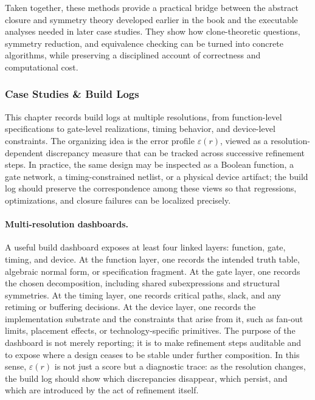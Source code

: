 \documentclass[11pt]{article}
\begin{document}
Taken together, these methods provide a practical bridge between the abstract closure and symmetry theory developed earlier in the book and the executable analyses needed in later case studies. They show how clone-theoretic questions, symmetry reduction, and equivalence checking can be turned into concrete algorithms, while preserving a disciplined account of correctness and computational cost.


\subsubsection{Case Studies \& Build Logs}

This chapter records build logs at multiple resolutions, from function-level specifications to gate-level realizations, timing behavior, and device-level constraints. The organizing idea is the error profile \(\varepsilon(r)\), viewed as a resolution-dependent discrepancy measure that can be tracked across successive refinement steps. In practice, the same design may be inspected as a Boolean function, a gate network, a timing-constrained netlist, or a physical device artifact; the build log should preserve the correspondence among these views so that regressions, optimizations, and closure failures can be localized precisely.

\paragraph{Multi-resolution dashboards.}
A useful build dashboard exposes at least four linked layers: function, gate, timing, and device. At the function layer, one records the intended truth table, algebraic normal form, or specification fragment. At the gate layer, one records the chosen decomposition, including shared subexpressions and structural symmetries. At the timing layer, one records critical paths, slack, and any retiming or buffering decisions. At the device layer, one records the implementation substrate and the constraints that arise from it, such as fan-out limits, placement effects, or technology-specific primitives. The purpose of the dashboard is not merely reporting; it is to make refinement steps auditable and to expose where a design ceases to be stable under further composition. In this sense, \(\varepsilon(r)\) is not just a score but a diagnostic trace: as the resolution changes, the build log should show which discrepancies disappear, which persist, and which are introduced by the act of refinement itself.
\end{document}

